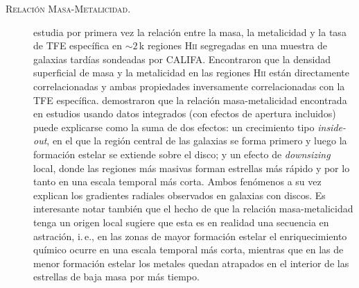 \documentclass{article}
\begin{document}
\begin{description}
%
\item[\textsc{Relación Masa-Metalicidad.}] \citet{Rosales2012} estudia por primera vez la relación
entre la masa, la metalicidad y la tasa de TFE específica en $\sim2\,$k regiones H\textsc{ii}
segregadas en una muestra de galaxias tardías sondeadas por CALIFA.
Encontraron que la densidad superficial de masa y la metalicidad en las regiones H\textsc{ii} están
directamente correlacionadas y ambas propiedades inversamente correlacionadas con la TFE específica.
\citeauthor{Rosales2012} demostraron que la relación masa-metalicidad encontrada en estudios usando
datos integrados (con efectos de apertura incluidos) puede explicarse como la suma de dos efectos:
un crecimiento tipo \emph{inside-out}, en el que la región central de las galaxias se forma primero
y luego la formación estelar se extiende sobre el disco; y un efecto de \emph{downsizing} local,
donde las regiones más masivas forman estrellas más rápido y por lo tanto en una escala temporal más
corta. Ambos fenómenos a su vez explican los gradientes radiales observados en galaxias con discos.
Es interesante notar también que el hecho de que la relación masa-metalicidad tenga un origen local
sugiere que esta es en realidad una secuencia en astración, i.\,e., en las zonas de mayor formación
estelar el enriquecimiento químico ocurre en una escala temporal más corta, mientras que en las de
menor formación estelar los metales quedan atrapados en el interior de las estrellas de baja masa
por más tiempo.


\end{description}
\end{document}
